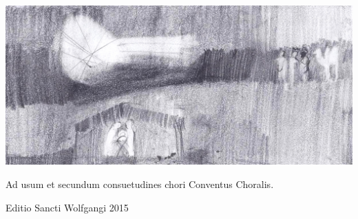 \documentclass[a4paper, twoside, 12pt]{article}
\newcommand{\annusEditionis}{2015}
\begin{document}

\def\greinitialformat#1{%
{\color{red}\fontsize{38}{38}\selectfont #1}%
}

\pagestyle{empty}

\begin{titulusOfficii}
\end{titulusOfficii}

\vspace{1.5cm}
\begin{center}
\includegraphics[width=15cm]{imagines/epiphania.jpg}
\end{center}

\vfill

\begin{center}
Ad usum et secundum consuetudines chori \guillemotright{}Conventus Choralis\guillemotleft.

Editio Sancti Wolfgangi \annusEditionis
\end{center}

\pagebreak

\renewcommand{\headrulewidth}{0pt} %
\fancyhf{}
\pagestyle{fancy}

 
\end{document}

